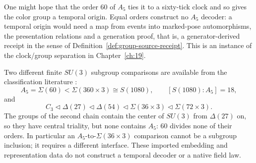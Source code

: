 One might hope that the order $60$ of $A_5$ ties it to a sixty-tick clock
and so gives the color group a temporal origin. Equal orders construct no
$A_5$ decoder: a temporal origin would need a map from events into
marked-pose automorphisms, the presentation relations and a generation
proof, that is, a generator-derived receipt in the sense of
Definition~\ref{def:group-source-receipt}.\label{conj:a5-forcing}
This is an instance of the clock/group separation in
Chapter~\ref{ch:19}.

Two different finite $SU(3)$ subgroup comparisons are available from
the classification literature \cite{GrimusLudl}:
\begin{equation}
 A_5=\Sigma(60)<\Sigma(360\times3)\cong S(1080),
 \qquad [S(1080):A_5]=18,
 \label{eq:a5-s1080}
\end{equation}
and
\begin{equation}
 C_3\triangleleft\Delta(27)\triangleleft\Delta(54)
 \triangleleft\Sigma(36\times3)\triangleleft\Sigma(72\times3).
 \label{eq:triadic-lineage}
\end{equation}
The groups of the second chain contain the center of $SU(3)$ from
$\Delta(27)$ on, so they have central triality, but none contains $A_5$:
$60$ divides none of their orders. In particular an
$A_5$-to-$\Sigma(36\times3)$ comparison cannot be a subgroup inclusion;
it requires a different interface. These imported embedding and
representation data do not construct a temporal decoder or a native
field law.
